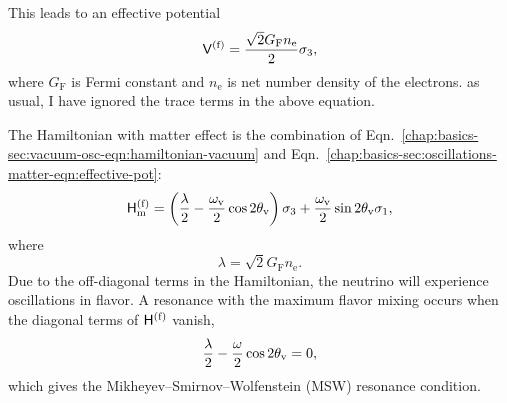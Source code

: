 This leads to an effective potential
\begin{equation}
\mathsf V^{(\ff)} = \frac{\sqrt{2}G_{\mathrm F} n_{\mathrm e} }{2}  \sigma_3,
\label{chap:basics-sec:oscillations-matter-eqn:effective-pot}
\end{equation}
where $G_{\mathrm F}$ is Fermi constant and $n_{\mathrm e}$ is net number density of the electrons. as usual, I have ignored the trace terms in the above equation.

The Hamiltonian with matter effect is the combination of Eqn.~\ref{chap:basics-sec:vacuum-osc-eqn:hamiltonian-vacuum} and Eqn.~\ref{chap:basics-sec:oscillations-matter-eqn:effective-pot}:
\begin{equation}
\mathsf H_\mm^{(\ff)} = \left(\frac{\lambda}{2} -\frac{ \omega_\vv }{2} \cos 2\theta_\vv \right) {\sigma}_3  + \frac{ \omega_\vv }{2} \sin 2\theta_\vv {\sigma}_1,
\label{chap:basics-sec:msw-eqn:hamiltonian-matter-effect}
\end{equation}
where
\begin{equation}
  \lambda = \sqrt{2}G_{\mathrm F} n_{\mathrm e}.
  \label{chap:basics-sec:oscillations-matter-eqn:lambda}
\end{equation}
Due to the off-diagonal terms in the Hamiltonian, the neutrino will experience oscillations in flavor. A resonance with the maximum flavor mixing occurs when the diagonal terms of $\mathsf H^{(\mathrm f)}$ vanish,
\begin{equation}
\frac{\lambda}{2} -\frac{ \omega }{2} \cos 2\theta_\mathrm v  = 0,
\end{equation}
which gives the Mikheyev--Smirnov--Wolfenstein (MSW) resonance condition.


